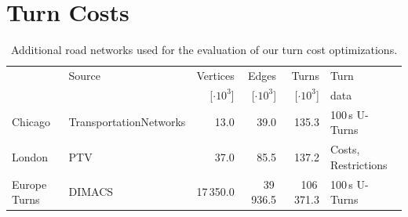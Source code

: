 \documentclass[a4paper, english, cleveref]{lipics-v2021}
\begin{document}
\section{Turn Costs}
\begin{table}
\centering
\caption{
Additional road networks used for the evaluation of our turn cost optimizations.
}\label{tab:add_turn_graphs}
\begin{tabular}{llrrrl}
\toprule
           & Source                 &       Vertices &          Edges &          Turns & Turn           \\
           &                        & [$\cdot 10^3$] & [$\cdot 10^3$] & [$\cdot 10^3$] & data           \\
\midrule
Chicago    & TransportationNetworks &           13.0 &           39.0 &          135.3 & 100\,s U-Turns \\
London     & PTV                    &           37.0 &           85.5 &          137.2 & Costs, Restrictions \\
Europe Turns & DIMACS               &      17\,350.0 &      39\,936.5 &     106\,371.3 & 100\,s U-Turns \\
\bottomrule
\end{tabular}
\end{table}


\begin{table}
\centering
\caption{
Performance of different CCH variants and optimizations to support turn costs.
We report the number of directed edges in the augmented graph and running times for each phase.
Directed hierarchies imply the removal of infinite shortcuts and reordering separator vertices builds on directed hierarchies and the removal of infinite shortcuts and all three variants used a cut order.
The experiment was conducted on the same benchmark machine used in~\cite{TODO}. %
}\label{tab:turn_opts_ext}

\end{table}
\end{document}
